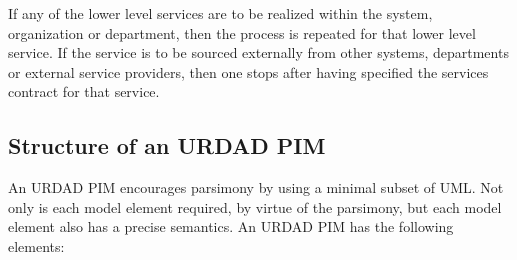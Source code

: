 If any of the lower level services are to be realized within the system, organization or department, then the process is repeated for that lower level service. If the service is to be sourced externally from other systems, departments or external service providers, then one stops after having specified the services contract for that service.


\subsection{Structure of an URDAD PIM}

An URDAD PIM encourages parsimony by using a minimal subset of UML. Not only is each model element required, by virtue of the parsimony, but each model element also has a precise semantics. An URDAD PIM has the following elements:
